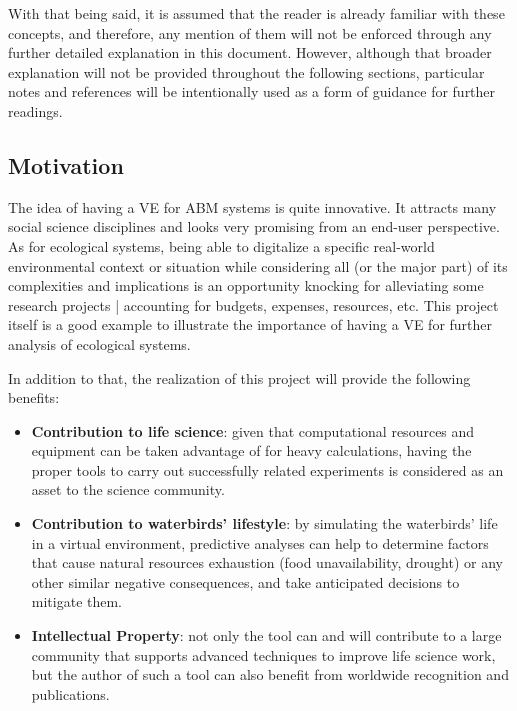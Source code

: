 With that being said, it is assumed that the reader is already familiar with these concepts, and therefore, any mention of them will not be enforced through any further detailed explanation in this document. However, although that broader explanation will not be provided throughout the following sections, particular notes and references will be intentionally used as a form of guidance for further readings.

\subsection{Motivation}
The idea of having a VE for ABM systems is quite innovative. It attracts many social science disciplines and looks very promising from an end-user perspective. As for ecological systems, being able to digitalize a specific real-world environmental context or situation while considering all (or the major part) of its complexities and implications is an opportunity knocking for alleviating some research projects | accounting for budgets, expenses, resources, etc. This project itself is a good example to illustrate the importance of having a VE for further analysis of ecological systems.

In addition to that, the realization of this project will provide the following benefits:
\begin{itemize}
    \item \textbf{Contribution to life science}: given that computational resources and equipment can be taken advantage of for heavy calculations, having the proper tools to carry out successfully related experiments is considered as an asset to the science community.
    \item \textbf{Contribution to waterbirds' lifestyle}: by simulating the waterbirds' life in a virtual environment, predictive analyses can help to determine factors that cause natural resources exhaustion (food unavailability, drought) or any other similar negative consequences, and take anticipated decisions to mitigate them.
    \item \textbf{Intellectual Property}: not only the tool can and will contribute to a large community that supports advanced techniques to improve life science work, but the author of such a tool can also benefit from worldwide recognition and publications.
\end{itemize}

